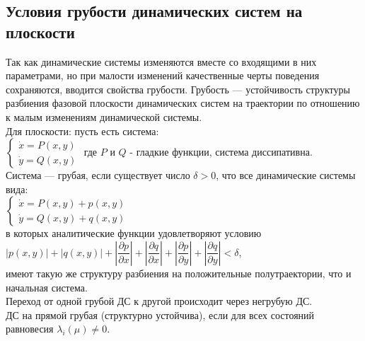 \begin{multicols*}{2}
		\section{Условия грубости динамических систем на плоскости}
		Так как динамические системы изменяются вместе со входящими в них параметрами, но при малости изменений качественные черты поведения сохраняются, вводится свойства грубости. Грубость — устойчивость структуры разбиения фазовой плоскости динамических систем на траектории по отношению к малым изменениям динамической системы.\\
		Для плоскости: пусть есть система:\\
		$\begin{cases}
			\dot{x} = P(x,y) \\
			\dot{y} = Q(x,y)
		\end{cases} $
		где $P$ и $Q$ - гладкие функции, система диссипативна.\\
		Система — грубая, если существует число $\delta>0$, что все динамические системы вида:\\
		$\begin{cases}
			\dot{x} = P(x,y) + p(x,y) \\
			\dot{y} = Q(x,y) + q(x,y)
		\end{cases} $\\
		в которых аналитические функции удовлетворяют условию\\
		$\left\lvert p(x,y)\right\rvert  + \left\lvert q(x,y)\right\rvert + \left\lvert \dfrac{\partial p}{\partial x}\right\rvert + \left\lvert \dfrac{\partial q}{\partial x}\right\rvert + \left\lvert \dfrac{\partial p}{\partial y}\right\rvert + \left\lvert \dfrac{\partial q}{\partial y}\right\rvert < \delta $,\\
		имеют такую же структуру разбиения на положительные полутраектории, что и начальная система.\\
		Переход от одной грубой ДС к другой происходит через негрубую ДС.\\
		ДС на прямой грубая (структурно устойчива), если для всех состояний равновесия $\lambda_i(\mu)\neq 0$.
		

\end{multicols*}
